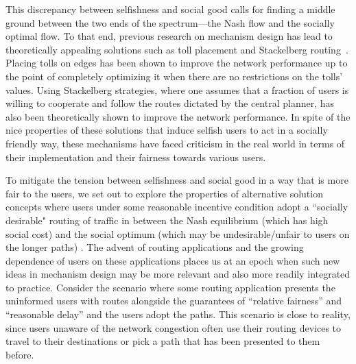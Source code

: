 This discrepancy between selfishness and social good calls for finding a middle ground between the two ends of the spectrum---the Nash flow and the socially optimal flow.  
To that end, previous research on mechanism design
has lead to theoretically appealing solutions such as 
toll placement and Stackelberg routing~\cite{swamy2012effectiveness}. Placing tolls on edges has been shown to improve the network performance up to the point of completely optimizing it when there are no restrictions on the tolls' values. Using Stackelberg strategies, where one assumes that a fraction of users is willing to cooperate and follow the routes dictated by the central planner, has also been theoretically shown to improve the network performance. In spite of the nice properties of these solutions that induce selfish users to act in a socially friendly way, these mechanisms have faced criticism in the real world in terms of their implementation and their fairness towards various users. 
 
To mitigate the tension between selfishness and social good in a way that is more fair to the users, we set out to explore the properties of alternative solution concepts 
where users under some reasonable incentive condition 
adopt a ``socially desirable" routing of traffic in between the Nash equilibrium (which has high social cost) and the social optimum (which may be undesirable/unfair to users on the longer paths) \cite{roughgarden2002unfair}.  
The advent of routing applications and the growing dependence of users on these applications 
places us at an epoch when such new ideas in mechanism design may be more relevant and also more readily integrated to practice. 
Consider the scenario where some routing application presents the uninformed users with routes alongside the guarantees of ``relative fairness'' and ``reasonable delay'' and the users adopt the paths. This scenario is close to reality, since users unaware of the network congestion often use their routing devices to travel to their destinations or pick a path that has been presented to them before. 

